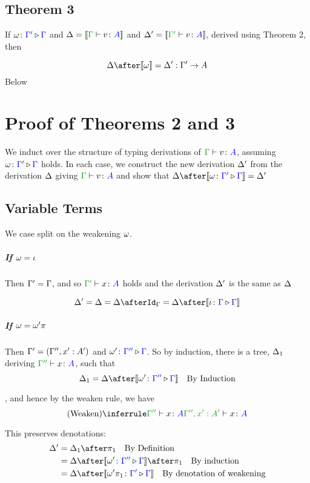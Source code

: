 \documentclass{report}
\begin{document}
\subsection{Theorem 3}

If $\omega \colon {\color{blue}\Gamma'} \triangleright {\color {blue} \Gamma}$ and $\D = \deno{\gtyperelation{v}{A}}$ and $\D' = \deno{\typerelation{\G'}{v}{A}}$, derived using Theorem 2, then 

$$
    \D \after \deno{\w} = \D' : \G' \rightarrow A
$$
\proof Below

\section{Proof of Theorems 2 and 3}
We induct over the structure of typing derivations of $\gtyperelation{v}{A}$, assuming $\omega \colon {\color{blue}\Gamma'} \triangleright {\color {blue} \Gamma}$ holds. In each case, we construct the new derivation $\Delta'$ from the derivation $\Delta$ giving $\gtyperelation{v}{A}$ and show that $\D\after\deno{\wrel{\w}{\G'}{\G}} = \D'$

\subsection{Variable Terms}
    We case split on the weakening $\omega$.
    \subparagraph{If $\omega = \iota$}
    Then $\Gamma' = \Gamma$, and so $\typerelation{\G'}{x}{A}$ holds and the derivation $\Delta'$ is the same as $\Delta$

    \begin{equation}
        \D' = \D = \D\after\idg = \D\after\deno{\wrel{\i}{\G}{\G}} 
    \end{equation}
    \subparagraph{If $\omega = \omega'\pi$}
    Then  $\Gamma' = (\Gamma'',x': A')$ and $\omega' \colon {\color{blue}\Gamma''} \triangleright {\color {blue} \Gamma}$. So by induction, there is a tree, $\Delta_1$ deriving $\typerelation{\G''}{x}{A}$,  such that 
    \begin{equation}
        \D_1 = \D\after\deno{\wrel{\w'}{\G''}{\G}} \qt{By Induction}
    \end{equation}
    
    , and hence by the weaken rule, we have 
    \begin{equation}
        \ntreeruleI{Weaken}{\typerelation{\G''}{x}{A}}{\typerelation{\G'', x':A' }{x}{A}}
    \end{equation}

    This preserves denotations:
    \begin{align}
        \D' & = \D_1\after\p\qt{By Definition} \\
        & = \D\after\deno{\wrel{\w'}{\G''}{\G}}\after\p\qt{By induction}\\
        & = \D\after\deno{\wrel{\w'\p}{\G'}{\G}}\qt{By denotation of weakening}
    \end{align}
\end{document}
